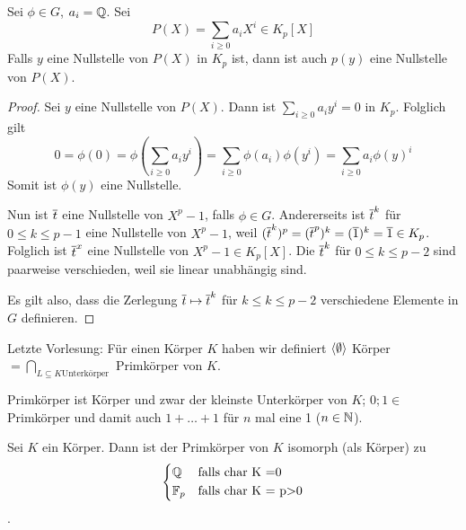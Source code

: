\documentclass[12pt,a4paper]{scrartcl}
\begin{document}
\begin{lem}
	Sei $\phi \in G$, $a_i = \mathbb Q$. Sei
	\begin{equation*}
		P(X) = \sum_{i \geq 0} a_iX^i \in K_p[X]
	\end{equation*}
	Falls $y$ eine Nullstelle von $P(X)$ in $K_p$ ist, dann ist auch $p(y)$ eine Nullstelle von $P(X)$.
\end{lem}

\begin{proof}
	Sei $y$ eine Nullstelle von $P(X)$. Dann ist $\sum_{i \geq 0} a_iy^i = 0$ in $K_p$. Folglich gilt 
	$$0 = \phi(0) = \phi\left( \sum_{i \geq 0} a_iy^i \right) = \sum_{i \geq 0} \phi(a_i) \phi(y^i) = \sum_{i \geq 0} a_i \phi(y)^i$$
	Somit ist $\phi(y)$ eine Nullstelle.
	
	Nun ist $\overline t$ eine Nullstelle von $X^p -1$, falls $\phi \in G$. Andererseits ist $\overline{t}^k$ für $0 \leq k \leq p-1$ eine Nullstelle von $X^p - 1$, weil $(\overline{t}^k)^p = (\overline{t}^p)^k = (\overline 1)^k = \overline 1 \in K_p$. Folglich ist $\overline{t}^x$ eine Nullstelle von $X^p-1 \in K_p[X]$. Die $\overline{t}^k$ für $0 \leq k \leq p-2$ sind paarweise verschieden, weil sie linear unabhängig sind.
	
	Es gilt also, dass die Zerlegung $\overline t \mapsto \overline{t}^k$ für $k \leq k \leq p-2$ verschiedene Elemente in $G$ definieren.  
\end{proof}





Letzte Vorlesung: Für einen Körper $K$ haben wir definiert $\langle\emptyset\rangle$ Körper $= \bigcap\limits_{L\subseteq K \text{Unterkörper}}$ Primkörper von $K$.

\begin{bem}
	Primkörper ist Körper und zwar der kleinste Unterkörper von $K$; $0;1\in $ Primkörper und damit auch $1+\dots+1$ für $n$ mal eine 1 ($n\in\mathbb N$).
\end{bem}

\begin{satz} Sei $K$ ein Körper. Dann ist der Primkörper von $K$ isomorph (als Körper) zu $$\begin{cases*} \IQ& \text{falls }char K =0\\
	\IF_p& \text{falls }char K = p>0\end{cases*}$$.
\end{satz}
\end{document}
